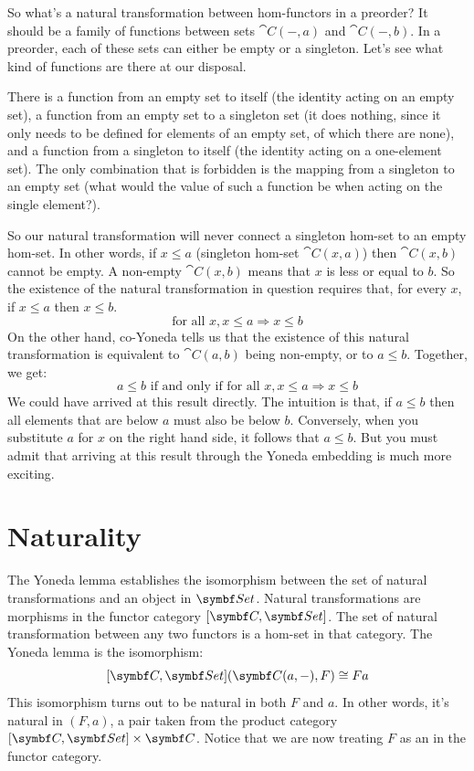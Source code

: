 So what's a natural transformation between hom-functors in a preorder?
It should be a family of functions between sets $\cat{C}(-, a)$ and
$\cat{C}(-, b)$. In a preorder, each of these sets can either be empty
or a singleton. Let's see what kind of functions are there at our
disposal.

There is a function from an empty set to itself (the identity acting on
an empty set), a function  from an empty set to a
singleton set (it does nothing, since it only needs to be defined for
elements of an empty set, of which there are none), and a function from
a singleton to itself (the identity acting on a one-element set). The
only combination that is forbidden is the mapping from a singleton to an
empty set (what would the value of such a function be when acting on the
single element?).

So our natural transformation will never connect a singleton hom-set to
an empty hom-set. In other words, if $x \leqslant a$
(singleton hom-set $\cat{C}(x, a)$) then $\cat{C}(x, b)$ cannot be
empty. A non-empty $\cat{C}(x, b)$ means that $x$ is less or
equal to $b$. So the existence of the natural transformation in
question requires that, for every $x$, if
$x \leqslant a$ then $x \leqslant b$.
\[\text{for all } x, x \leqslant a \Rightarrow x \leqslant b\]
On the other hand, co-Yoneda tells us that the existence of this natural
transformation is equivalent to $\cat{C}(a, b)$ being non-empty, or to
$a \leqslant b$. Together, we get:
\[a \leqslant b \text{ if and only if for all } x, x \leqslant a \Rightarrow x \leqslant b\]
We could have arrived at this result directly. The intuition is that, if
$a \leqslant b$ then all elements that are below $a$
must also be below $b$. Conversely, when you substitute
$a$ for $x$ on the right hand side, it follows that
$a \leqslant b$. But you must admit that arriving at this
result through the Yoneda embedding is much more exciting.

\section{Naturality}

The Yoneda lemma establishes the isomorphism between the set of natural
transformations and an object in $\Set$. Natural transformations
are morphisms in the functor category $[\cat{C}, \Set]$. The set of
natural transformation between any two functors is a hom-set in that
category. The Yoneda lemma is the isomorphism:
\[[\cat{C}, \Set](\cat{C}(a, -), F) \cong F a\]
This isomorphism turns out to be natural in both $F$ and
$a$. In other words, it's natural in $(F, a)$, a pair
taken from the product category  $[\cat{C}, \Set] \times \cat{C}$. Notice
that we are now treating $F$ as an  in the functor
category.

